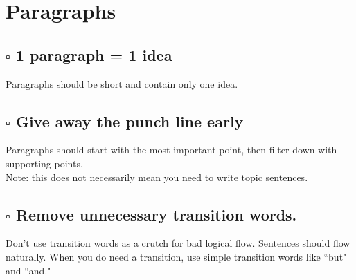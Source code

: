 \documentclass{article}
\begin{document}
\section*{Paragraphs}
\begin{adjustwidth}{1cm}{}

    \subsection*{$\square$ 1 paragraph = 1 idea}

    \begin{adjustwidth}{1cm}{}
        Paragraphs should be short and contain only one idea. 
    \end{adjustwidth}

    \subsection*{$\square$ Give away the punch line early}

    \begin{adjustwidth}{1cm}{}
        Paragraphs should start with the most important point, then filter down with supporting points.
        \\
        
        \noindent
        Note: this does not necessarily mean you need to write topic sentences. 
    \end{adjustwidth}
    
    \subsection*{$\square$ Remove unnecessary transition words.}

    \begin{adjustwidth}{1cm}{}
        Don't use transition words as a crutch for bad logical flow. Sentences should flow naturally. When you do need a transition, use simple transition words like ``but" and ``and."
    \end{adjustwidth}


 
\end{adjustwidth}
\end{document}
